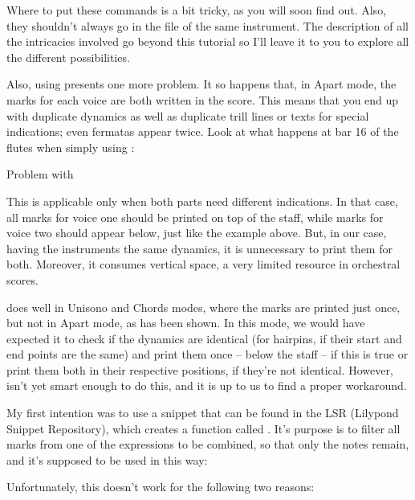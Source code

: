 \documentclass[../../LilyPond-Tutorials]{subfiles}
\begin{document}
Where to put these commands is a bit tricky, as you will soon find out.
Also, they shouldn't always go in the file of the same instrument.
The description of all the intricacies involved go beyond this tutorial so I'll leave it to you to explore all the different possibilities.

Also, using  presents one more problem.
It so happens that, in Apart mode, the marks for each voice are both written in the score.
This means that you end up with duplicate dynamics as well as duplicate trill lines or texts for special indications; even fermatas appear twice.
Look at what happens at bar 16 of the flutes when simply using :

\begin{musicExample}
    \caption{Problem with }
\label{xmp:partcombine-example-one}
\end{musicExample}

This is applicable only when both parts need different indications.
In that case, all marks for voice one should be printed on top of the staff, while marks for voice two should appear below, just like the example above.
But, in our case, having the instruments the same dynamics, it is unnecessary to print them for both.
Moreover, it consumes vertical space, a very limited resource in orchestral scores.

 does well in Unisono and Chords modes, where the marks are printed just once, but not in Apart mode, as has been shown.
In this mode, we would have expected it to check if the dynamics are identical (for hairpins, if their start and end points are the same) and print them once -- below the staff -- if this is true or print them both in their respective positions, if they're not identical.
However,  isn't yet smart enough to do this, and it is up to us to find a proper workaround.

My first intention was to use a snippet that can be found in the LSR (Lilypond Snippet Repository),  which creates a function called .
It's purpose is to filter all marks from one of the expressions to be combined, so that only the notes remain, and it's supposed to be used in this way:

\begin{lilypondcode}
\partcombine { \ExpressionOne \filtermusic \ExpressionTwo }
\end{lilypondcode}

Unfortunately, this doesn't work for the following two reasons:
\end{document}
